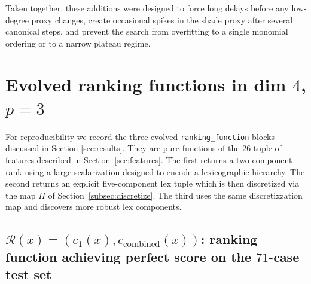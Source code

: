 \documentclass[11pt]{amsart}
\begin{document}
Taken together, these additions were designed to force long delays before any low-degree proxy changes,
create occasional spikes in the shade proxy after several canonical steps, and prevent the search from
overfitting to a single monomial ordering or to a narrow plateau regime.

\section{Evolved ranking functions in dim $4$, $p=3$}
\label{app:evolved}

For reproducibility we record the three evolved \texttt{ranking\_function} blocks discussed in Section \ref{sec:results}. They are pure functions of the $26$-tuple of features described in Section~\ref{sec:features}.
The first returns a two-component rank using a large scalarization designed to encode a lexicographic hierarchy.
The second returns an explicit five-component lex tuple which is then discretized via the map $\Pi$ of Section~\ref{subsec:discretize}. The third uses the same discretixzation map and discovers more robust lex components.  

\subsection{$\mathcal{R}(x) = (c_1(x), c_{\mathrm{combined}}(x))$: ranking function achieving perfect score on the $71$-case test set}
\end{document}
